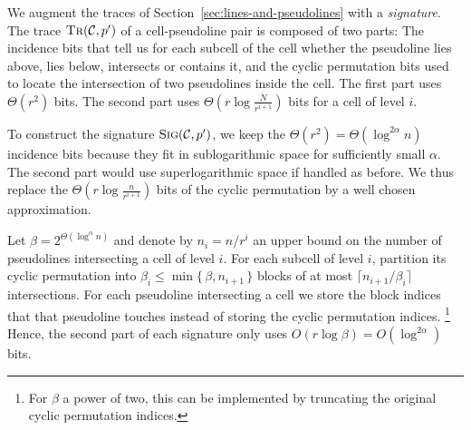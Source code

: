 We augment the traces of Section~\ref{sec:lines-and-pseudolines} with a \emph{signature}.
The trace \(\textsc{Tr}(\mathcal{C}, p')\) of a cell-pseudoline pair
is composed of two parts:
The incidence bits
that tell us for each subcell of the cell whether the pseudoline lies above, lies below, intersects
or contains it, and the cyclic permutation bits used to locate the intersection
of two pseudolines inside the cell.
The first part uses \(\Theta(r^2)\) bits.
The second part uses \(\Theta(r \log{\frac{N}{r^{i+1}}})\) bits for a cell of
level \(i\).

To construct the signature \(\textsc{Sig}(\mathcal{C}, p')\),
we keep the \(\Theta(r^2) = \Theta(\log^{2\alpha} n)\) incidence bits because
they fit in sublogarithmic space for sufficiently small \(\alpha\).
The second part would use superlogarithmic space if handled as before.
We thus replace the \(\Theta(r \log{\frac{n}{r^{i+1}}})\) bits of the
cyclic permutation by a well chosen approximation.

Let \(\beta = 2^{\Theta(\log^{\alpha} n)}\) and denote by \(n_i = n/r^i\)
an upper bound on the number of pseudolines intersecting a cell of level \(i\). For
each subcell of level \(i\), partition its cyclic permutation into
\(\beta_i \leq \min \{\, \beta , n_{i+1} \,\} \) blocks
of at most \(\lceil n_{i+1} / \beta_i \rceil\) intersections.
%
For each pseudoline intersecting a cell we store the block indices that
that pseudoline touches instead of storing the cyclic permutation indices.%
\footnote{For \(\beta\) a power of two, this can be implemented by truncating
the original cyclic permutation indices.}
Hence, the second part
of each signature only uses \(O(r \log \beta) = O(\log^{2\alpha})\) bits.

